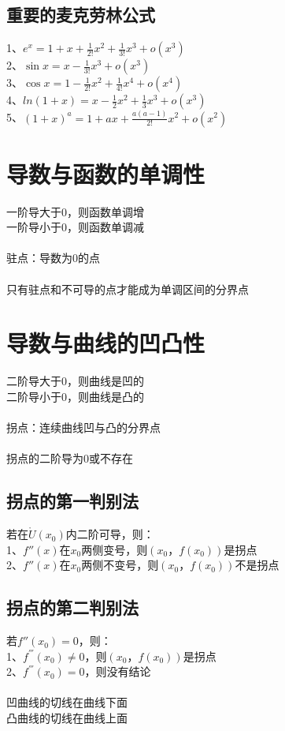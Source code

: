 \documentclass{article}
\begin{document}
\begin{flushleft}
	\subsection{重要的麦克劳林公式}
	
	1、$e^x=1+x+\frac{1}{2!}x^2+\frac{1}{3!}x^3+o(x^3)$\\
	2、$\sin x=x-\frac{1}{3!}x^3+o(x^3)$\\
	3、$\cos x=1-\frac{1}{2!}x^2+\frac{1}{4!}x^4+o(x^4)$\\
	4、$ln(1+x)=x-\frac{1}{2}x^2+\frac{1}{3}x^3+o(x^3)$\\
	5、$(1+x)^a=1+ax+\frac{a(a-1)}{2!}x^2+o(x^2)$\\
	
	\section{导数与函数的单调性}
	
	一阶导大于0，则函数单调增\\
	一阶导小于0，则函数单调减\\
	~\\
	驻点：导数为0的点\\
	~\\
	只有驻点和不可导的点才能成为单调区间的分界点\\
	
	\section{导数与曲线的凹凸性}
	
	二阶导大于0，则曲线是凹的\\
	二阶导小于0，则曲线是凸的\\
	~\\
	拐点：连续曲线凹与凸的分界点\\
	~\\
	拐点的二阶导为0或不存在\\

	\subsection{拐点的第一判别法}
	若在$\mathring{U}(x_0)$内二阶可导，则：\\
	1、$f''(x)$在$x_0$两侧变号，则$(x_0，f(x_0))$是拐点\\
	2、$f''(x)$在$x_0$两侧不变号，则$(x_0，f(x_0))$不是拐点\\

	\subsection{拐点的第二判别法}
	若$f''(x_0)=0$，则：\\
	1、$f^{'''}(x_0)\neq 0$，则$(x_0，f(x_0))$是拐点\\
	2、$f^{'''}(x_0)=0$，则没有结论\\
	~\\
	凹曲线的切线在曲线下面\\
	凸曲线的切线在曲线上面\\
	

\end{flushleft}
\end{document}
